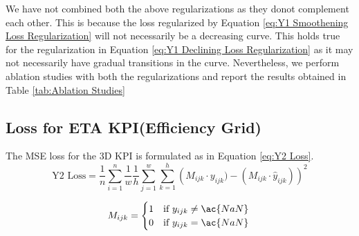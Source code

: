 \documentclass{report} %
\begin{document}
\begin{enumerate}

\end{enumerate}

We have not combined both the above regularizations as they donot complement each other. This is because the loss regularized by Equation \ref{eq:Y1 Smoothening Loss Regularization} will not necessarily be a decreasing curve.
This holds true for the regularization in Equation \ref{eq:Y1 Declining Loss Regularization} as it may not necessarily have gradual transitions in the curve.
Nevertheless, we perform ablation studies with both the regularizations and report the results obtained in Table \ref{tab:Ablation Studies}

\subsection{Loss for ETA \ac{KPI}(Efficiency Grid)}\label{sec:Loss for 3D KPI}

The \ac{MSE} loss for the \ac{3D} \ac{KPI} is formulated as in Equation \ref{eq:Y2 Loss}.
\begin{equation}
\text{Y2 Loss} = \frac{1}{n} \sum_{i=1}^{n} \frac{1}{w} \frac{1}{h} \sum_{j=1}^{w} \sum_{k=1}^{h} \left( M_{ijk} \cdot y_{ijk}) - (M_{ijk} \cdot \hat{y}_{ijk})\right)^2
\label{eq:Y2 Loss}
\end{equation}

\begin{equation}
    M_{ijk} = \begin{cases}
        1 & \text{if } y_{ijk} \neq \ac{NaN} \\
        0 & \text{if } y_{ijk} = \ac{NaN} 
        \end{cases} \\
\label{eq:Mask matrix}
\end{equation}
\end{document}

